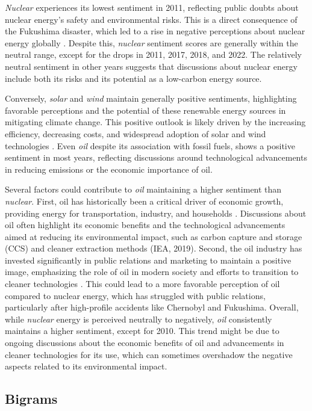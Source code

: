 \emph{Nuclear} experiences its lowest sentiment in 2011, reflecting public doubts about nuclear energy's safety and environmental risks. This is a direct consequence of the Fukushima disaster, which led to a rise in negative perceptions about nuclear energy globally \cite{WNA2012}. Despite this, \emph{nuclear} sentiment scores are generally within the neutral range, except for the drops in 2011, 2017, 2018, and 2022. The relatively neutral sentiment in other years suggests that discussions about nuclear energy include both its risks and its potential as a low-carbon energy source.

Conversely, \emph{solar} and \emph{wind} maintain generally positive sentiments, highlighting favorable perceptions and the potential of these renewable energy sources in mitigating climate change. This positive outlook is likely driven by the increasing efficiency, decreasing costs, and widespread adoption of solar and wind technologies \cite{irena2018roadmap}. Even \emph{oil} despite its association with fossil fuels, shows a positive sentiment in most years, reflecting discussions around technological advancements in reducing emissions or the economic importance of oil.

Several factors could contribute to \emph{oil} maintaining a higher sentiment than \emph{nuclear}. First, oil has historically been a critical driver of economic growth, providing energy for transportation, industry, and households \cite{CAVALCANTI2013475}. Discussions about oil often highlight its economic benefits and the technological advancements aimed at reducing its environmental impact, such as carbon capture and storage (CCS) and cleaner extraction methods (IEA, 2019).
Second, the oil industry has invested significantly in public relations and marketing to maintain a positive image, emphasizing the role of oil in modern society and efforts to transition to cleaner technologies \cite{ExxonMobil2021}. This could lead to a more favorable perception of oil compared to nuclear energy, which has struggled with public relations, particularly after high-profile accidents like Chernobyl and Fukushima.
Overall, while \emph{nuclear} energy is perceived neutrally to negatively, \emph{oil} consistently maintains a higher sentiment, except for 2010. This trend might be due to ongoing discussions about the economic benefits of oil and advancements in cleaner technologies for its use, which can sometimes overshadow the negative aspects related to its environmental impact.

\subsection{Bigrams}
